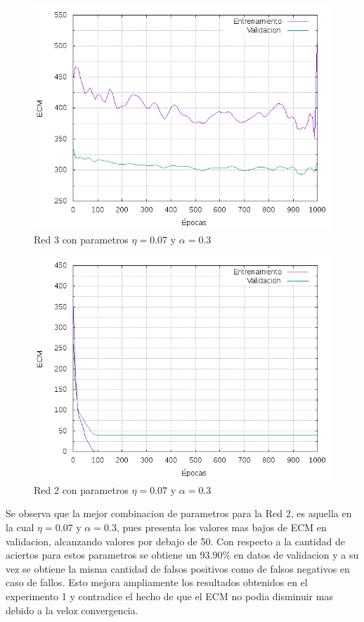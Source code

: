 \begin{figure}[h!]
  \includegraphics[width=125mm]{imagenes/ej1/ex_2-4_red_11-6-6-9-1_errors.png}
  \caption{Red 3 con parametros $\eta = 0.07 $ y $ \alpha = 0.3$}
\end{figure}

\begin{figure}[h!]
  \includegraphics[width=125mm]{imagenes/ej1/ex_2-4_red_11-21-1_errors.png}
  \caption{Red 2 con parametros $\eta = 0.07 $ y $ \alpha = 0.3$}
\end{figure}

Se observa que la mejor combinacion de parametros para la Red 2, es aquella en la cual $\eta = 0.07$ y $\alpha = 0.3$, pues presenta los valores
mas bajos de ECM en validacion, alcanzando valores por debajo de 50. Con respecto a la cantidad de aciertos para estos parametros se obtiene un
93.90\% en datos de validacion y a su vez se obtiene la misma cantidad de falsos positivos como de falsos negativos en caso de fallos.
 Esto mejora ampliamente los resultados obtenidos en el experimento 1 y contradice el hecho de que el ECM no podia disminuir mas debido a la veloz
 convergencia.

